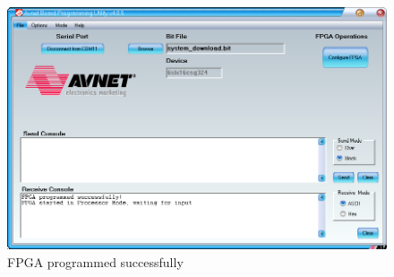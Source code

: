 \begin{figure}[ht]
    \centering
    \includegraphics[scale=0.5]{figures/AVNET.png}
    \caption{FPGA programmed successfully} 
    \label{fig:avprog}
\end{figure}

